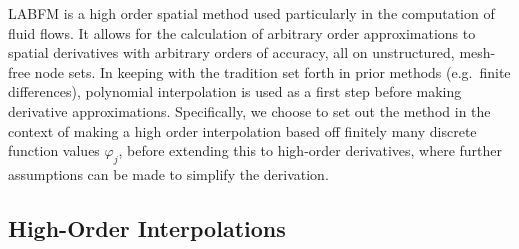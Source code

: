 LABFM \cite{king2020HighOrderDifference} is a high order spatial method used particularly in the computation of fluid flows. It allows for the calculation of arbitrary order approximations to spatial derivatives with arbitrary orders of accuracy, all on unstructured, mesh-free node sets. In keeping with the tradition set forth in prior methods (e.g.\ finite differences), polynomial interpolation is used as a first step before making derivative approximations. Specifically, we choose to set out the method in the context of making a high order interpolation based off finitely many discrete function values $φ_j$, before extending this to high-order derivatives, where further assumptions can be made to simplify the derivation.


\subsection{High-Order Interpolations}

